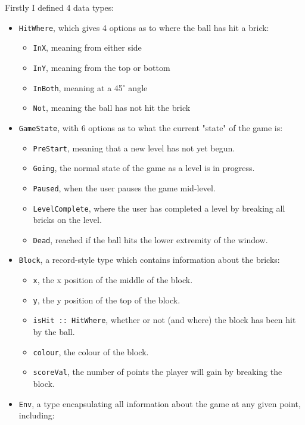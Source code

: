 \documentclass[12pt]{article}
\begin{document}
Firstly I defined 4 data types:
\begin{itemize}
  \item \verb|HitWhere|, which gives 4 options as to where the ball has hit a brick:
    \begin{itemize}
      \item \verb|InX|, meaning from either side
      \item \verb|InY|, meaning from the top or bottom
      \item \verb|InBoth|, meaning at a 45$^{\circ}$ angle
      \item \verb|Not|, meaning the ball has not hit the brick
    \end{itemize}
  \item \verb|GameState|, with 6 options as to what the current "state" of the game is:
    \begin{itemize}
      \item \verb|PreStart|, meaning that a new level has not yet begun.
      \item \verb|Going|, the normal state of the game as a level is in progress.
      \item \verb|Paused|, when the user pauses the game mid-level.
      \item \verb|LevelComplete|, where the user has completed a level by breaking all bricks on the level.
      \item \verb|Dead|, reached if the ball hits the lower extremity of the window.
    \end{itemize}
  \item \verb|Block|, a record-style type which contains information about the bricks:
    \begin{itemize}
      \item \verb|x|, the x position of the middle of the block.
      \item \verb|y|, the y position of the top of the block.
      \item \verb|isHit :: HitWhere|, whether or not (and where) the block has been hit by the ball.
      \item \verb|colour|, the colour of the block.
      \item \verb|scoreVal|, the number of points the player will gain by breaking the block.
    \end{itemize}
  \item \verb|Env|, a type encapsulating all information about the game at any given point, including:
    \begin{itemize}

\end{itemize}
\end{itemize}
\end{document}

